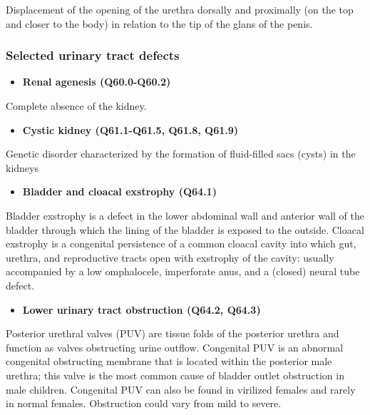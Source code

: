\documentclass[
]{krantz}
\providecommand{\tightlist}{%
  \setlength{\itemsep}{0pt}\setlength{\parskip}{0pt}}
\begin{document}
Displacement of the opening of the urethra dorsally and proximally (on the top and closer to the body) in relation to the tip of the glans of the penis.

\hypertarget{section2118}{%
\subsubsection{Selected urinary tract defects}\label{section2118}}

\begin{itemize}
\tightlist
\item
  \textbf{Renal agenesis (Q60.0-Q60.2)}
\end{itemize}

Complete absence of the kidney.

\begin{itemize}
\tightlist
\item
  \textbf{Cystic kidney (Q61.1-Q61.5, Q61.8, Q61.9)}
\end{itemize}

Genetic disorder characterized by the formation of fluid-filled sacs (cysts) in the kidneys

\begin{itemize}
\tightlist
\item
  \textbf{Bladder and cloacal exstrophy (Q64.1)}
\end{itemize}

Bladder exstrophy is a defect in the lower abdominal wall and anterior wall of the bladder through which the lining of the bladder is exposed to the outside. Cloacal exstrophy is a congenital persistence of a common cloacal cavity into which gut, urethra, and reproductive tracts open with exstrophy of the cavity: usually accompanied by a low omphalocele, imperforate anus, and a (closed) neural tube defect.

\begin{itemize}
\tightlist
\item
  \textbf{Lower urinary tract obstruction (Q64.2, Q64.3)}
\end{itemize}

Posterior urethral valves (PUV) are tissue folds of the posterior urethra and function as valves obstructing urine outflow. Congenital PUV is an abnormal congenital obstructing membrane that is located within the posterior male urethra; this valve is the most common cause of bladder outlet obstruction in male children. Congenital PUV can also be found in virilized females and rarely in normal females. Obstruction could vary from mild to severe.
\end{document}
